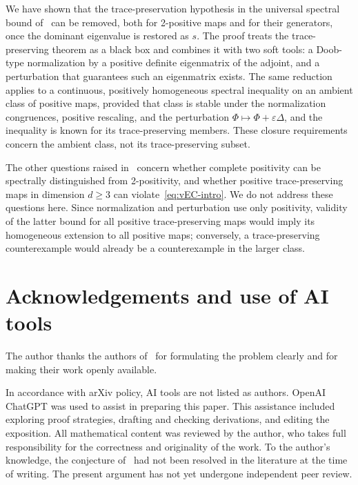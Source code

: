 \documentclass[11pt,a4paper]{article}
\theoremstyle{plain}
\theoremstyle{definition}
\theoremstyle{remark}
\numberwithin{equation}{section}
\newcommand{\smax}{s}
\newcommand{\eps}{\varepsilon}
\begin{document}
We have shown that the trace-preservation hypothesis in the universal spectral
bound of~\cite{vEC+26} can be removed, both for 2-positive maps and for their
generators, once the dominant eigenvalue is restored as $\smax$. The proof treats
the trace-preserving theorem as a black box and combines it with two soft tools:
a Doob-type normalization by a positive definite eigenmatrix of the adjoint, and a
perturbation that guarantees such an eigenmatrix exists. The same reduction
applies to a continuous, positively homogeneous spectral inequality on an
ambient class of positive maps, provided that class is stable under the
normalization congruences, positive rescaling, and the perturbation
$\Phi\mapsto\Phi+\eps\Delta$, and the inequality is known for its
trace-preserving members. These closure requirements concern the ambient
class, not its trace-preserving subset.

The other questions raised in~\cite{vEC+26} concern whether complete
positivity can be spectrally distinguished from 2-positivity, and whether
positive trace-preserving maps in dimension $d\ge3$ can violate~\eqref{eq:vEC-intro}.
We do not address these questions here. Since normalization and perturbation
use only positivity, validity of the latter bound for all positive
trace-preserving maps would imply its homogeneous extension to all positive
maps; conversely, a trace-preserving counterexample would already be a
counterexample in the larger class.

\section*{Acknowledgements and use of AI tools}

The author thanks the authors of~\cite{vEC+26} for formulating the problem
clearly and for making their work openly available.

In accordance with arXiv policy, AI tools are not listed as authors. OpenAI
ChatGPT was used to assist in preparing this paper. This assistance included
exploring proof strategies, drafting and checking derivations, and editing the
exposition. All mathematical content was reviewed by the author, who takes full
responsibility for the correctness and originality of the work. To the author's
knowledge, the conjecture of~\cite[Sec.~3]{vEC+26} had not been resolved in the
literature at the time of writing. The present argument has not yet undergone
independent peer review.
\end{document}
